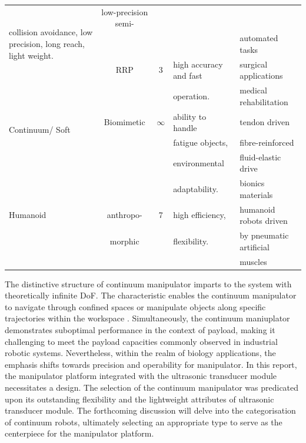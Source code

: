 \begin{center}
\begin{longtable}{l c c l l}
    \multirow{3}{*}{\parbox{40mm}{collision avoidance, low precision, long reach, light weight.}} &
    low-precision semi- \\
    & & & & automated tasks \cite{RRR_application1,RRR_application2}\\
    SCARA \cite{SCARA_review}& RRP & 3 & 
    high accuracy and fast  &
    surgical applications \cite{SCARA_application1}\\
    & & & operation. & medical rehabilitation \cite{SCARA_application2}\\
    \multirow{2}{25mm}{Continuum/ Soft \cite{soft_review1,soft_review2}} & Biomimetic & $\infty$ & 
    ability to handle  & 
    tendon driven \cite{tenden_driven_application1, tenden_driven_application2,tenden_driven_application3}\\
    & & & fatigue objects, & fibre-reinforced \cite{fiber_application1,fiber_application2}\\
    & & & environmental & fluid-elastic drive \cite{fluid_application1,fluid_application2,fluid_application3}\\
    & & & adaptability. & bionics materials \cite{SMA,dielectric_high-elastic_polymers,IPMC}\\
    Humanoid & anthropo- & 7 & high efficiency, & humanoid robots driven \\
    & morphic& & flexibility.& by pneumatic artificial\\ 
    & & & & muscles \cite{humanoid_7dof}\\ \hline
    \end{longtable}
\end{center}
\noindent The distinctive structure of continuum manipulator imparts to the system with theoretically 
infinite DoF. The characteristic enables the continuum manipulator to navigate through confined spaces 
or manipulate objects along specific trajectories within the workspace \cite{CR_medical_application,
soft_review1,soft_review2}. Simultaneously, the continuum 
maniuplator demonstrates suboptimal performance in the context of payload, making it challenging to meet 
the payload capacities commonly observed in industrial robotic systems. Nevertheless, within the realm 
of biology applications, the emphasis shifts towards precision and operability for manipulator. In this 
report, the manipulator platform integrated with the ultrasonic transducer module necessitates a design. 
The selection of the continuum manipulator was predicated upon its outstanding flexibility and the 
lightweight attributes of ultrasonic transducer module. The forthcoming discussion will delve into the 
categorisation of continuum robots, ultimately selecting an appropriate type to serve as the centerpiece 
for the manipulator platform.


